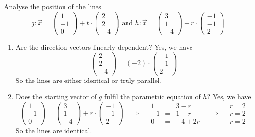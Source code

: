 \documentclass[12pt,eng]{skript_ogg}
\begin{document}
\begin{beispiel}
Analyse the position of the lines
\[g:\vec{x}=\begin{pmatrix}1\\-1\\0\end{pmatrix}+t\cdot \begin{pmatrix}2\\2\\-4\end{pmatrix}\text{ and }h:\vec{x}=\begin{pmatrix}3\\1\\-4\end{pmatrix}+r\cdot \begin{pmatrix}-1\\-1\\2\end{pmatrix}\]
\begin{enumerate}
	\item Are the direction vectors linearly dependent? Yes, we have
	\[\begin{pmatrix}2\\2\\-4\end{pmatrix}=(-2)\cdot\begin{pmatrix}-1\\-1\\2\end{pmatrix}\]
	So the lines are either identical or truly parallel.
	\item Does the starting vector of $g$ fulfil the parametric equation of $h$? Yes, we have
	\[\begin{pmatrix}1\\-1\\0\end{pmatrix}=\begin{pmatrix}3\\1\\-4\end{pmatrix}+r\cdot \begin{pmatrix}-1\\-1\\2\end{pmatrix}\quad\Rightarrow\quad\begin{array}{rcl}
	1 & = & 3-r\\
	-1 & = & 1-r\\
	0 & = & -4+2r
	\end{array}\quad\Rightarrow\quad\begin{array}{l}
	r=2\\
	r=2\\
	r=2
	\end{array}\]
	So the lines are identical.	
\end{enumerate}
\end{beispiel}
\end{document}
